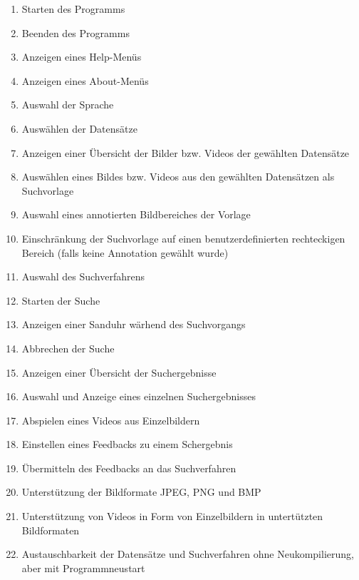 \begin{enumerate} [label=\bfseries /F \arabic*0/]
	\subsection{Pflicht}
	\item Starten des Programms
	\item Beenden des Programms
	\item Anzeigen eines Help-Menüs
	\item Anzeigen eines About-Menüs
	\item Auswahl der Sprache
	\newline
	\item Ausw\"ahlen der Datens\"atze
	\item Anzeigen einer Übersicht der Bilder bzw. Videos der gewählten Datensätze
	\item Ausw\"ahlen eines Bildes bzw. Videos aus den gewählten Datensätzen als Suchvorlage
	\item Auswahl eines annotierten Bildbereiches der Vorlage
	\item Einschränkung der Suchvorlage auf einen benutzerdefinierten rechteckigen Bereich (falls keine Annotation gewählt wurde)
	\item Auswahl des Suchverfahrens
	\newline
	\item Starten der Suche
	\item Anzeigen einer Sanduhr w\"arhend des Suchvorgangs
	\item Abbrechen der Suche
	\newline
	\item Anzeigen einer \"Ubersicht der Suchergebnisse
	\item Auswahl und Anzeige eines einzelnen Suchergebnisses
	\item Abspielen eines Videos aus Einzelbildern
	\item Einstellen eines Feedbacks zu einem Schergebnis
	\item \"Ubermitteln des Feedbacks an das Suchverfahren
	\newline
	\item Unterstützung der Bildformate JPEG, PNG und BMP
	\item Unterstützung von Videos in Form von Einzelbildern in untert\"utzten Bildformaten
	\newline
	\item Austauschbarkeit der Datensätze und Suchverfahren ohne Neukompilierung, aber mit Programmneustart


\end{enumerate}
